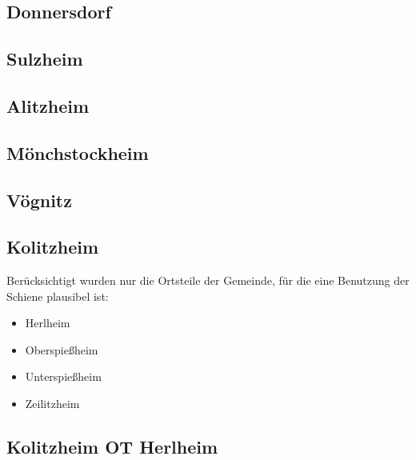 \documentclass[fontsize=12pt,a4paper]{scrreprt}
\begin{document}
\begin{landscape}
                \subsection{Donnersdorf}
                
                
                \subsection{Sulzheim}
                
                
                \subsection{Alitzheim}
                
                
                \subsection{Mönchstockheim}
                
                
                \subsection{Vögnitz}
                
                
                \subsection{Kolitzheim}
                Berücksichtigt wurden nur die Ortsteile der Gemeinde, für die eine Benutzung der Schiene plausibel ist:\newline
                \begin{itemize}[nosep]
                    \item Herlheim
                    \item Oberspießheim
                    \item Unterspießheim
                    \item Zeilitzheim
                \end{itemize}
                
                \subsection{Kolitzheim OT Herlheim}
                
                

\end{landscape}
\end{document}
